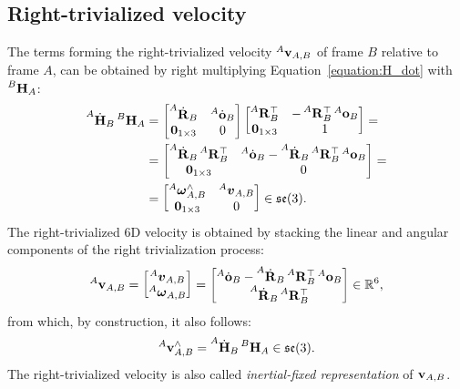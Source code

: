 \subsection{Right-trivialized velocity}
\label{sec:right_trivialized_velocity}

The terms forming the right-trivialized velocity $\velsix[A]_{A,B}$ of frame $B$ relative to frame $A$, can be obtained by right multiplying Equation~\eqref{equation:H_dot} with $\homo[B]_A$:
%
\begin{align*}
    \homod[A]_B \homo[B]_A
    &= \begin{bmatrix}
        \rotd[A]_B & \orid[A]_B \\ \zeros_{1\times 3} & 0
    \end{bmatrix}
    \begin{bmatrix}
        \rot[A]_B^\top & -\rot[A]_B^\top \ori[A]_B \\
        \zeros_{1\times3} & 1
    \end{bmatrix}
    =\\
    &= \begin{bmatrix}
        \rotd[A]_B \rot[A]_B^\top & \orid[A]_B - \rotd[A]_B \rot[A]_B^\top \ori[A]_B \\
        \zeros_{1\times 3} & 0
    \end{bmatrix} = \\
    &=
    \begin{bmatrix}
        \velang[A]_{A,B}^\wedge & \vellin[A]_{A,B} \\
        \zeros_{1\times 3} & 0
    \end{bmatrix}
    \in \se(3)
    .
\end{align*}
%
The right-trivialized 6D velocity is obtained by stacking the linear and angular components of the right trivialization process:
%
\begin{equation*}
    \velsix[A]_{A,B} =
    \begin{bmatrix}
        \vellin[A]_{A,B} \\ \velang[A]_{A,B}
    \end{bmatrix} =
    \begin{bmatrix}
        \orid[A]_B - \rotd[A]_B \rot[A]_B^\top \ori[A]_B \\
        \rotd[A]_B \rot[A]_B^\top
    \end{bmatrix}
    \in \realn^6
    ,
\end{equation*}
%
from which, by construction, it also follows:
%
\begin{equation*}
    \velsix[A]_{A,B}^\wedge = \homod[A]_B \homo[B]_A \in \se(3)
    .
\end{equation*}
%
The right-trivialized velocity is also called \emph{inertial-fixed representation} of $\velsix_{A,B}$.

